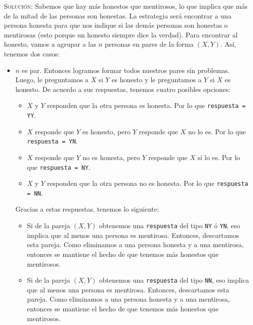 \documentclass[letterpaper,11pt]{article}
\begin{document}
\begin{enumerate}
    \textsc{Solución:} Sabemos que hay más honestos que mentirosos, lo que 
    implica que más de la mitad de las personas son honestas. La estrategia 
    será encontrar a una persona honesta para que nos indique si las demás 
    personas son honestas o mentirosas (esto porque un honesto siempre dice 
    la verdad). Para encontrar al honesto, vamos a agrupar a las $n$ personas 
    en pares de la forma $(X, Y)$. Así, tenemos dos casos:
    \begin{itemize}
        \item $n$ es par. Entonces logramos formar todos nuestros pares sin 
        problemas. Luego, le preguntamos a $X$ si $Y$ es honesto y le 
        preguntamos a $Y$ si $X$ es honesto. De acuerdo a sus respuestas, 
        tenemos cuatro posibles opciones:
        \begin{itemize}
            \item $X$ y $Y$ responden que la otra persona es honesta. Por 
            lo que \texttt{respuesta = YY}.

            \item $X$ responde que $Y$ es honesto, pero $Y$ responde que $X$ 
            no lo es. Por lo que \texttt{respuesta = YN}.

            \item $X$ responde que $Y$ no es honesta, pero $Y$ responde que 
            $X$ sí lo es. Por lo que \texttt{respuesta = NY}.

            \item $X$ y $Y$ responden que la otra persona no es honesta. Por 
            lo que \texttt{respuesta = NN}.
        \end{itemize}

        Gracias a estas respuestas, tenemos lo siguiente: 
        \begin{itemize}
            \item Si de la pareja $(X,Y)$ obtenemos una \texttt{respuesta} del 
            tipo \texttt{NY} ó \texttt{YN}, eso implica que al menos una persona
            es mentirosa. Entonces, descartamos esta pareja. Como eliminamos 
            a una persona honesta y a una mentirosa, entonces se mantiene el
            hecho de que tenemos más honestos que mentirosos. 

            \item Si de la pareja $(X,Y)$ obtenemos una \texttt{respuesta} del 
            tipo \texttt{NN}, eso implica que al menos una persona es mentirosa.
            Entonces, descartamos esta pareja. Como eliminamos a una persona 
            honesta y a una mentirosa, entonces se mantiene el hecho de que 
            tenemos más honestos que mentirosos.


\end{itemize}
\end{itemize}
\end{enumerate}
\end{document}

